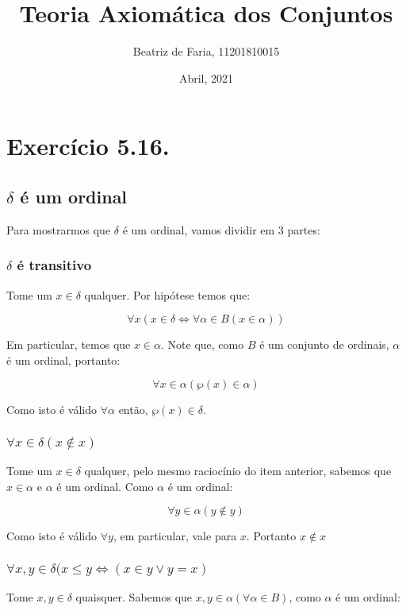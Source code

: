 \documentclass[12pt]{extarticle}
\title{Teoria Axiomática dos Conjuntos}
\author{Beatriz de Faria, 11201810015}
\date{Abril, 2021}
\begin{document}
\maketitle

\section{Exercício 5.16.}

\subsection{$\delta$ é um ordinal}

Para mostrarmos que $\delta$ é um ordinal, vamos dividir em 3 partes:

\subsubsection{$\delta$ é transitivo}

Tome um $x \in \delta$ qualquer. Por hipótese temos que:

$$
\forall x (x \in \delta \Leftrightarrow \forall \alpha \in B (x \in \alpha))
$$

Em particular, temos que $x \in \alpha$. Note que, como $B$ é um conjunto de ordinais, $\alpha$ é um ordinal, portanto:

$$
\forall x \in \alpha (\wp(x) \in \alpha)
$$

Como isto é válido $\forall \alpha$ então, $\wp(x) \in \delta$.

\subsubsection{$\forall x \in \delta (x \notin x)$}

Tome um $x \in \delta$ qualquer, pelo mesmo raciocínio do item anterior, sabemos que $x \in \alpha$ e $\alpha$ é um ordinal. Como $\alpha$ é um ordinal:

$$
\forall y \in \alpha (y \notin y)
$$

Como isto é válido $\forall y$, em particular, vale para $x$. Portanto $x \notin x$

\subsubsection{$\forall x,y \in \delta (x \leq y \Leftrightarrow (x \in y \lor y = x)$}

Tome $x,y \in \delta$ quaisquer. Sabemos que $x,y \in \alpha (\forall \alpha \in B)$, como $\alpha$ é um ordinal:
\end{document}
